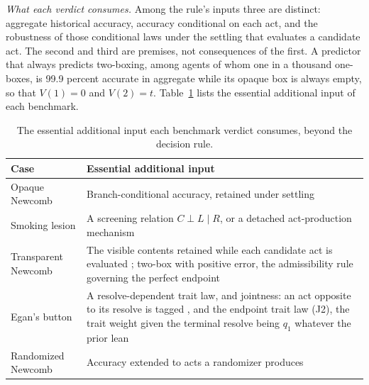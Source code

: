 \noindent\emph{What each verdict consumes.} Among the rule's inputs three are distinct: aggregate historical accuracy, accuracy conditional on each act, and the robustness of those conditional laws under the settling that evaluates a candidate act. The second and third are premises, not consequences of the first. A predictor that always predicts two-boxing, among agents of whom one in a thousand one-boxes, is 99.9 percent accurate in aggregate while its opaque box is always empty, so that $V(1) = 0$ and $V(2) = t$. Table~\ref{tab:inputs} lists the essential additional input of each benchmark.
\begin{table}[ht]
\centering
\small
\caption{The essential additional input each benchmark verdict consumes, beyond the decision rule.}
\label{tab:inputs}
\begin{tabular}{p{} p{}}
\hline
Case & Essential additional input \\
\hline
Opaque Newcomb & Branch-conditional accuracy, retained under settling \\
Smoking lesion & A screening relation $C \perp L \mid R$, or a detached act-production mechanism \\
Transparent Newcomb & The visible contents retained while each candidate act is evaluated ; two-box with positive error, the admissibility rule governing the perfect endpoint \\
Egan's button & A resolve-dependent trait law, and jointness: an act opposite to its resolve is tagged , and the endpoint trait law (J2), the trait weight given the terminal resolve being $q_1$ whatever the prior lean \\
Randomized Newcomb & Accuracy extended to acts a randomizer produces \\
\hline
\end{tabular}
\end{table}


